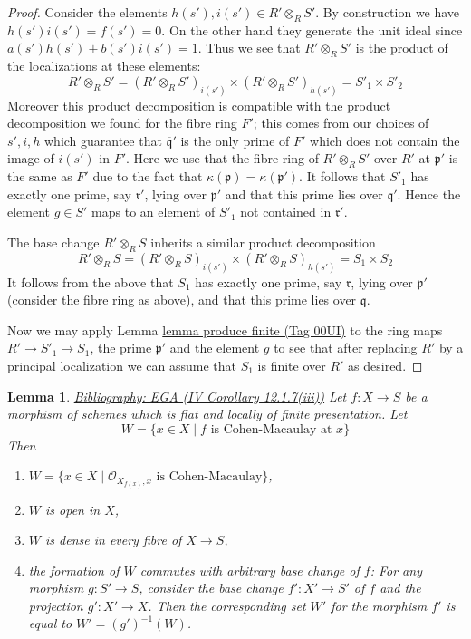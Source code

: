 \documentclass{amsart}
\newenvironment{reference}{\comment}{\endcomment}
\theoremstyle{plain}
\newtheorem{lemma}[subsection]{Lemma}
\theoremstyle{definition}
\theoremstyle{remark}
\numberwithin{equation}{subsection}
\begin{document}
\begin{proof}
\medskip\noindent
Consider the elements $h(s'), i(s') \in R' \otimes_R S'$.
By construction we have $h(s')i(s') = f(s') = 0$. On the other
hand they generate the unit ideal since $a(s')h(s') + b(s')i(s') = 1$.
Thus we see that $R' \otimes_R S'$ is the product of the
localizations at these elements:
$$
R' \otimes_R S'
=
(R' \otimes_R S')_{i(s')}
\times
(R' \otimes_R S')_{h(s')}
=
S'_1 \times S'_2
$$
Moreover this product decomposition is compatible with the product
decomposition we found for the fibre ring $F'$; this comes from our
choices of $s', i, h$ which guarantee that $\overline{\mathfrak q}'$
is the only prime of $F'$ which does not contain the image of $i(s')$
in $F'$. Here we use that the fibre ring of $R'\otimes_R S'$ over $R'$ at
$\mathfrak p'$ is the same as $F'$ due to the fact that
$\kappa(\mathfrak p) = \kappa(\mathfrak p')$.
It follows that $S'_1$  has exactly
one prime, say $\mathfrak r'$,
lying over $\mathfrak p'$ and
that this prime lies over $\mathfrak q'$.
Hence the element $g \in S'$ maps to an element of $S'_1$ not contained
in $\mathfrak r'$.

\medskip\noindent
The base change $R'\otimes_R S$ inherits a similar product decomposition
$$
R' \otimes_R S
=
(R' \otimes_R S)_{i(s')}
\times
(R' \otimes_R S)_{h(s')}
=
S_1 \times S_2
$$
It follows from the above that $S_1$ has exactly
one prime, say $\mathfrak r$,
lying over $\mathfrak p'$ (consider the fibre ring as above),
and that this prime lies over $\mathfrak q$.

\medskip\noindent
Now we may apply Lemma \href{https://stacks.math.columbia.edu/tag/00UI}{lemma produce finite (Tag 00UI)} to the ring maps
$R' \to S'_1 \to S_1$, the prime $\mathfrak p'$ and
the element $g$ to see that after replacing $R'$ by
a principal localization we can assume that $S_1$ is
finite over $R'$ as desired.
\end{proof}


\begin{lemma}
\label{more-morphisms-lemma-flat-finite-presentation-CM-open}
\begin{reference}
\href{https://stacks.math.columbia.edu/bibliography}{Bibliography: EGA (IV Corollary 12.1.7(iii))}
\end{reference}
Let $f : X \to S$ be a morphism of schemes which is flat and locally
of finite presentation. Let
$$
W = \{x \in X \mid f\text{ is Cohen-Macaulay at }x\}
$$
Then
\begin{enumerate}
\item $W = \{x \in X \mid \mathcal{O}_{X_{f(x)}, x}\text{ is Cohen-Macaulay}\}$,
\item $W$ is open in $X$,
\item $W$ is dense in every fibre of $X \to S$,
\item the formation of $W$ commutes with arbitrary base change of $f$:
For any morphism $g : S' \to S$, consider
the base change $f' : X' \to S'$ of $f$ and the
projection $g' : X' \to X$. Then the corresponding
set $W'$ for the morphism $f'$ is equal to $W' = (g')^{-1}(W)$.
\end{enumerate}
\end{lemma}
\end{document}
